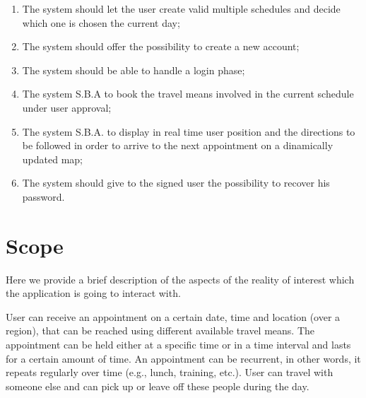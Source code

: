 \begin{enumerate}
\item The system should let the user create valid multiple schedules and decide which one is chosen the current day;
\label{goal:G5}

\item The system should offer the possibility to create a new account;
\label{goal:G6}

\item The system should be able to handle a login phase;
\label{goal:G7}

\item The system S.B.A to book the travel means involved in the current schedule under user approval;
\label{goal:G8} 


\item The system S.B.A. to display in real time user position and the directions to be followed in order to arrive to the next appointment on a dinamically updated map; \label{G10}

\item The system should give to the signed user the possibility to recover his password.
\label{G11}

\end{enumerate}


\section{Scope}
Here we provide a brief description of the aspects of the reality of interest which the application is going to interact with.

User can receive an appointment on a certain date, time and location (over a region), that can be reached using different available travel means. The appointment can be held either at a specific time or in a time interval and lasts for a certain amount of time. An appointment can be recurrent, in other words, it repeats regularly over time (e.g., lunch, training, etc.). User can travel with someone else and can pick up or leave off these people during the day.

